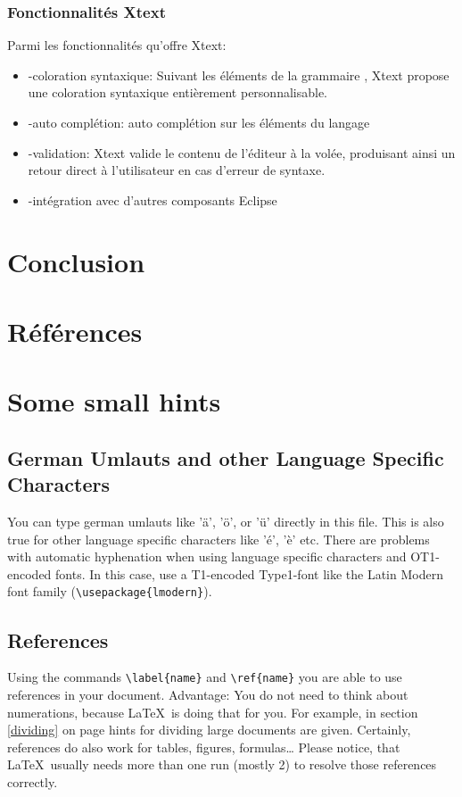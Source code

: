 \documentclass{article}
\begin{document}
{\subsubsection{Fonctionnalités Xtext}
Parmi les fonctionnalités qu’offre Xtext:
\begin{itemize}
			\item -coloration syntaxique: Suivant les éléments de la grammaire , Xtext propose une coloration syntaxique entièrement     personnalisable.
			\item -auto complétion: auto complétion sur les éléments du langage 
			\item -validation: Xtext valide le contenu de l'éditeur à la volée, produisant ainsi un retour direct à l’utilisateur en cas d’erreur de syntaxe.
			\item -intégration avec d’autres composants Eclipse 
\end{itemize}

\section{Conclusion}
\label{hints}

\section{Références}
\label{hints}
\section{Some small hints}
\label{hints}
\subsection{German Umlauts and other Language Specific Characters}
\label{umlauts}
You can type german umlauts like 'ä', 'ö', or 'ü' directly in this file.
This is also true for other language specific characters like 'é', 'è' etc.
There are problems with automatic hyphenation when using language
specific characters and OT1-encoded fonts. In this case, use a
T1-encoded Type1-font like the Latin Modern font family (\verb#\usepackage{lmodern}#).
\subsection{References}
\label{references}
Using the commands \verb#\label{name}# and \verb#\ref{name}# you are able
to use references in your document. Advantage: You do not need to think
about numerations, because \LaTeX\ is doing that for you.
For example, in section \ref{dividing} on page \pageref{dividing} hints for
dividing large documents are given.
Certainly, references do also work for tables, figures, formulas\ldots
Please notice, that \LaTeX\ usually needs more than one run (mostly 2) to
resolve those references correctly.
}
\end{document}
